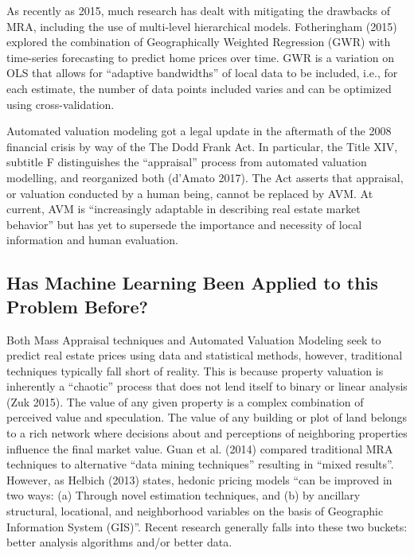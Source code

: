 \documentclass[12pt,]{article}
\begin{document}
As recently as 2015, much research has dealt with mitigating the
drawbacks of MRA, including the use of multi-level hierarchical models.
Fotheringham (2015) explored the combination of Geographically Weighted
Regression (GWR) with time-series forecasting to predict home prices
over time. GWR is a variation on OLS that allows for ``adaptive
bandwidths'' of local data to be included, i.e., for each estimate, the
number of data points included varies and can be optimized using
cross-validation.

Automated valuation modeling got a legal update in the aftermath of the
2008 financial crisis by way of the The Dodd Frank Act. In particular,
the Title XIV, subtitle F distinguishes the ``appraisal'' process from
automated valuation modelling, and reorganized both (d'Amato 2017). The
Act asserts that appraisal, or valuation conducted by a human being,
cannot be replaced by AVM. At current, AVM is ``increasingly adaptable
in describing real estate market behavior'' but has yet to supersede the
importance and necessity of local information and human evaluation.

\hypertarget{has-machine-learning-been-applied-to-this-problem-before}{%
\subsection{Has Machine Learning Been Applied to this Problem
Before?}\label{has-machine-learning-been-applied-to-this-problem-before}}

Both Mass Appraisal techniques and Automated Valuation Modeling seek to
predict real estate prices using data and statistical methods, however,
traditional techniques typically fall short of reality. This is because
property valuation is inherently a ``chaotic'' process that does not
lend itself to binary or linear analysis (Zuk 2015). The value of any
given property is a complex combination of perceived value and
speculation. The value of any building or plot of land belongs to a rich
network where decisions about and perceptions of neighboring properties
influence the final market value. Guan et al. (2014) compared
traditional MRA techniques to alternative ``data mining techniques''
resulting in ``mixed results''. However, as Helbich (2013) states,
hedonic pricing models ``can be improved in two ways: (a) Through novel
estimation techniques, and (b) by ancillary structural, locational, and
neighborhood variables on the basis of Geographic Information System
(GIS)''. Recent research generally falls into these two buckets: better
analysis algorithms and/or better data.
\end{document}
